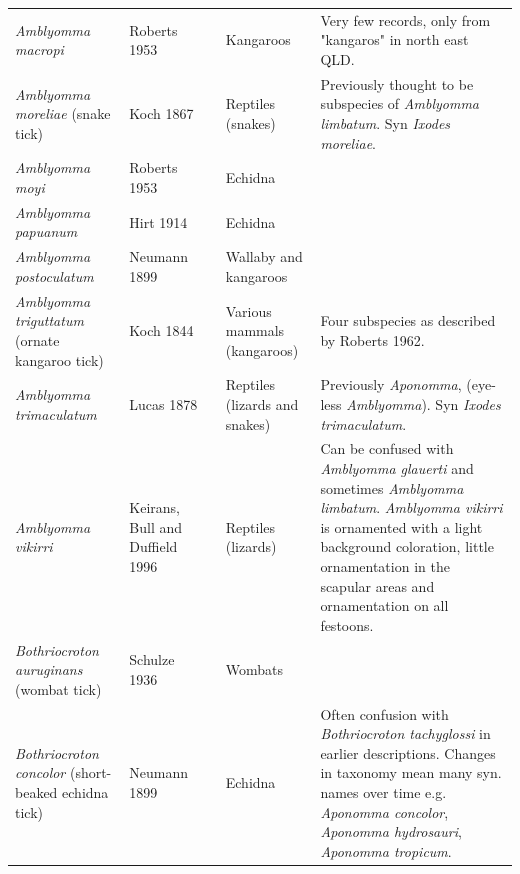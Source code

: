 \documentclass[a4paper, nobind]{templates/ociamthesis}
\begin{document}
\begin{landscape}
\begin{longtable}[t]{>{\raggedright\arraybackslash}p{4cm}>{\raggedright\arraybackslash}p{3cm}>{\raggedright\arraybackslash}p{1cm}>{\raggedright\arraybackslash}p{4cm}>{\raggedright\arraybackslash}p{6cm}}
\textit{Amblyomma macropi} & Roberts 1953 & \multicolumn{1}{c}{\cellcolor[HTML]{BEBADA}{\textcolor{white}{N}}} & Kangaroos & Very few records, only from "kangaros" in north east QLD.\\
\textit{Amblyomma moreliae} (snake tick) & Koch 1867 & \multicolumn{1}{c}{\cellcolor[HTML]{8DD3C7}{\textcolor{white}{Y}}} & Reptiles (snakes) & Previously thought to be subspecies of \textit{Amblyomma limbatum}. Syn \textit{Ixodes moreliae}.\\
\textit{Amblyomma moyi} & Roberts 1953 & \multicolumn{1}{c}{\cellcolor[HTML]{BEBADA}{\textcolor{white}{N}}} & Echidna & \\
\textit{Amblyomma papuanum} & Hirt 1914 & \multicolumn{1}{c}{\cellcolor[HTML]{BEBADA}{\textcolor{white}{N}}} & Echidna & \\
\textit{Amblyomma postoculatum} & Neumann 1899 & \multicolumn{1}{c}{\cellcolor[HTML]{8DD3C7}{\textcolor{white}{Y}}} & Wallaby and kangaroos & \\
\textit{Amblyomma triguttatum} (ornate kangaroo tick) & Koch 1844 & \multicolumn{1}{c}{\cellcolor[HTML]{8DD3C7}{\textcolor{white}{Y}}} & Various mammals (kangaroos) & Four subspecies as described by Roberts 1962.\\
\textit{Amblyomma trimaculatum} & Lucas 1878 & \multicolumn{1}{c}{\cellcolor[HTML]{BEBADA}{\textcolor{white}{N}}} & Reptiles (lizards and snakes) & Previously \textit{Aponomma}, (eye-less \textit{Amblyomma}). Syn \textit{Ixodes trimaculatum}.\\
\textit{Amblyomma vikirri} & Keirans, Bull and Duffield 1996 & \multicolumn{1}{c}{\cellcolor[HTML]{BEBADA}{\textcolor{white}{N}}} & Reptiles (lizards) & Can be confused with \textit{Amblyomma glauerti} and sometimes \textit{Amblyomma limbatum}. \textit{Amblyomma vikirri} is ornamented with a light background coloration, little ornamentation in the scapular areas and ornamentation on all festoons.\\
\textit{Bothriocroton auruginans} (wombat tick) & Schulze 1936 & \multicolumn{1}{c}{\cellcolor[HTML]{8DD3C7}{\textcolor{white}{Y}}} & Wombats & \\
\textit{Bothriocroton concolor} (short-beaked echidna tick) & Neumann 1899 & \multicolumn{1}{c}{\cellcolor[HTML]{BEBADA}{\textcolor{white}{N}}} & Echidna & Often confusion with \textit{Bothriocroton tachyglossi} in earlier descriptions. Changes in taxonomy mean many syn. names over time e.g. \textit{Aponomma concolor}, \textit{Aponomma hydrosauri}, \textit{Aponomma tropicum}.\\

\end{longtable}
\end{landscape}
\end{document}
